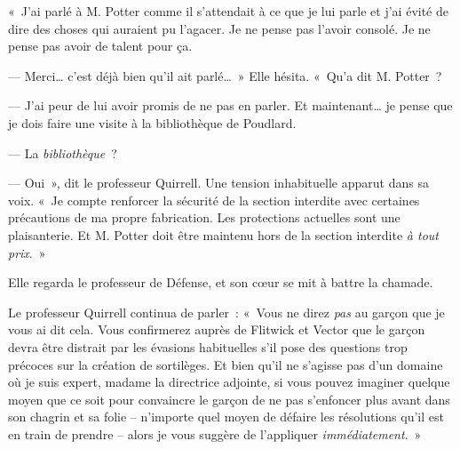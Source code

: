 «~J'ai parlé à M. Potter comme il s'attendait à ce que je lui parle et j'ai évité de dire des choses qui auraient pu l'agacer.
Je ne pense pas l'avoir consolé.
Je ne pense pas avoir de talent pour ça.

--- Merci… c'est déjà bien qu'il ait parlé…~»
Elle hésita.
«~Qu'a dit M. Potter~?

--- J'ai peur de lui avoir promis de ne pas en parler.
Et maintenant… je pense que je dois faire une visite à la bibliothèque de Poudlard.

--- La \emph{bibliothèque}~?

--- Oui~», dit le professeur Quirrell.
Une tension inhabituelle apparut dans sa voix.
«~Je compte renforcer la sécurité de la section interdite avec certaines précautions de ma propre fabrication.
Les protections actuelles sont une plaisanterie.
Et M. Potter doit être maintenu hors de la section interdite \emph{à tout prix}.~»

Elle regarda le professeur de Défense, et son cœur se mit à battre la chamade.

Le professeur Quirrell continua de parler~: «~Vous ne direz \emph{pas} au garçon que je vous ai dit cela.
Vous confirmerez auprès de Flitwick et Vector que le garçon devra être distrait par les évasions habituelles s'il pose des questions trop précoces sur la création de sortilèges.
Et bien qu'il ne s'agisse pas d'un domaine où je suis expert, madame la directrice adjointe, si vous pouvez imaginer quelque moyen que ce soit pour convaincre le garçon de ne pas s'enfoncer plus avant dans son chagrin et sa folie -- n'importe quel moyen de défaire les résolutions qu'il est en train de prendre -- alors je vous suggère de l'appliquer \emph{immédiatement}.~»
